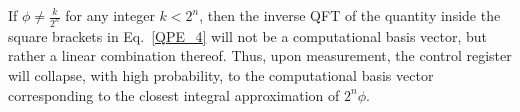 \documentclass[12pt,oneside]{book}
\begin{document}
\begin{enumerate}
    If $\phi \neq \frac{k}{2^n}$ for any integer $k<2^n$, then the inverse QFT of the  quantity inside the square brackets in Eq.~\ref{QPE_4} will not be a computational basis vector, but rather a linear combination thereof. Thus, upon measurement, the control register will collapse, with high probability, to the computational basis vector corresponding to the closest integral approximation of $2^n\phi$.
\end{enumerate}
\end{document}
